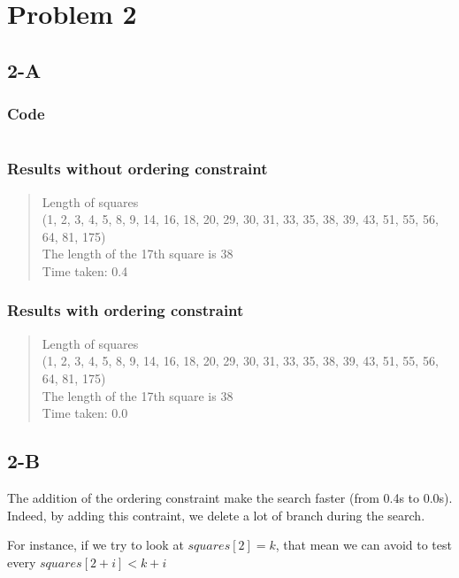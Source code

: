 \documentclass{article}
\begin{document}
    \section{Problem 2}
        \subsection{2-A}
            \subsubsection{Code}
                \inputminted[linenos=true]{python}{square.py}
            \subsubsection{Results without ordering constraint}
                \begin{quote}
                    Length of squares\\
                    (1, 2, 3, 4, 5, 8, 9, 14, 16, 18, 20, 29, 30, 31, 33, 35, 38, 39, 43, 51, 55, 56, 64, 81, 175)\\
                    The length of the 17th square is 38\\
                    Time taken: 0.4
                \end{quote}
            \subsubsection{Results with ordering constraint}
                \begin{quote}
                    Length of squares\\
                    (1, 2, 3, 4, 5, 8, 9, 14, 16, 18, 20, 29, 30, 31, 33, 35, 38, 39, 43, 51, 55, 56, 64, 81, 175)\\
                    The length of the 17th square is 38\\
                    Time taken: 0.0
                \end{quote}


        \subsection{2-B}
            The addition of the ordering constraint make the search faster (from 0.4s to 0.0s).\\
            Indeed, by adding this contraint, we delete a lot of branch during the search.

            For instance, if we try to look at $squares[2]=k$, that mean we can avoid to test every $squares[2+i]<k+i$
\end{document}
